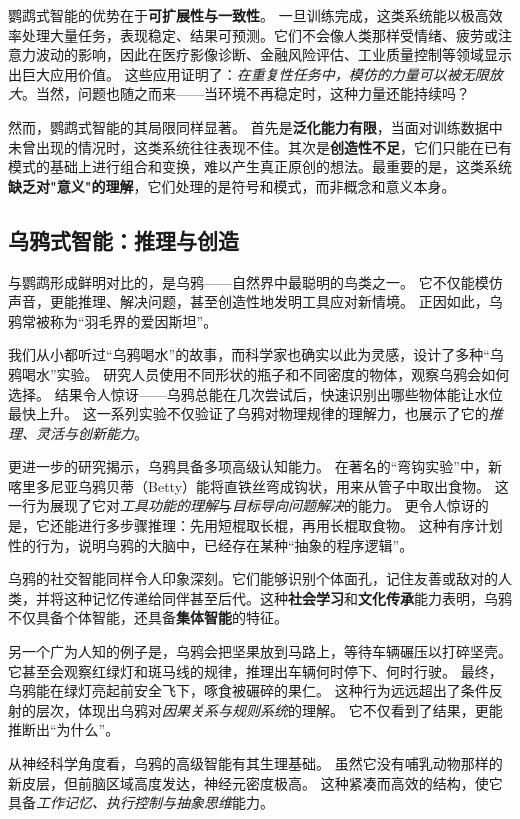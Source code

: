 鹦鹉式智能的优势在于\textbf{可扩展性与一致性}。
一旦训练完成，这类系统能以极高效率处理大量任务，表现稳定、结果可预测。它们不会像人类那样受情绪、疲劳或注意力波动的影响，因此在医疗影像诊断、金融风险评估、工业质量控制等领域显示出巨大应用价值。
这些应用证明了：\emph{在重复性任务中，模仿的力量可以被无限放大}。当然，问题也随之而来——当环境不再稳定时，这种力量还能持续吗？

然而，鹦鹉式智能的其局限同样显著。
首先是\textbf{泛化能力有限}，当面对训练数据中未曾出现的情况时，这类系统往往表现不佳。其次是\textbf{创造性不足}，它们只能在已有模式的基础上进行组合和变换，难以产生真正原创的想法。最重要的是，这类系统\textbf{缺乏对"意义"的理解}，它们处理的是符号和模式，而非概念和意义本身。

\subsection{乌鸦式智能：推理与创造}
与鹦鹉形成鲜明对比的，是乌鸦——自然界中最聪明的鸟类之一。
它不仅能模仿声音，更能推理、解决问题，甚至创造性地发明工具应对新情境。
正因如此，乌鸦常被称为“羽毛界的爱因斯坦”。

我们从小都听过“乌鸦喝水”的故事，而科学家也确实以此为灵感，设计了多种“乌鸦喝水”实验。
研究人员使用不同形状的瓶子和不同密度的物体，观察乌鸦会如何选择。
结果令人惊讶——乌鸦总能在几次尝试后，快速识别出哪些物体能让水位最快上升。
这一系列实验不仅验证了乌鸦对物理规律的理解力，也展示了它的\emph{推理、灵活与创新能力}。

更进一步的研究揭示，乌鸦具备多项高级认知能力。
在著名的“弯钩实验”中，新喀里多尼亚乌鸦贝蒂（Betty）能将直铁丝弯成钩状，用来从管子中取出食物。
这一行为展现了它对\emph{工具功能的理解}与\emph{目标导向问题解决}的能力。
更令人惊讶的是，它还能进行多步骤推理：先用短棍取长棍，再用长棍取食物。
这种有序计划性的行为，说明乌鸦的大脑中，已经存在某种“抽象的程序逻辑”。

乌鸦的社交智能同样令人印象深刻。它们能够识别个体面孔，记住友善或敌对的人类，并将这种记忆传递给同伴甚至后代。这种\textbf{社会学习}和\textbf{文化传承}能力表明，乌鸦不仅具备个体智能，还具备\textbf{集体智能}的特征。

另一个广为人知的例子是，乌鸦会把坚果放到马路上，等待车辆碾压以打碎坚壳。
它甚至会观察红绿灯和斑马线的规律，推理出车辆何时停下、何时行驶。
最终，乌鸦能在绿灯亮起前安全飞下，啄食被碾碎的果仁。
这种行为远远超出了条件反射的层次，体现出乌鸦对\emph{因果关系与规则系统}的理解。
它不仅看到了结果，更能推断出“为什么”。

从神经科学角度看，乌鸦的高级智能有其生理基础。
虽然它没有哺乳动物那样的新皮层，但前脑区域高度发达，神经元密度极高。
这种紧凑而高效的结构，使它具备\emph{工作记忆、执行控制与抽象思维}能力。

